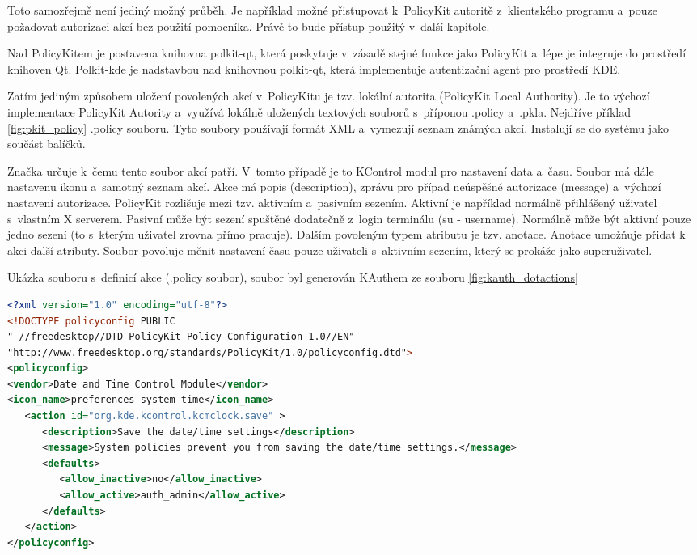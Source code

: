 Toto samozřejmě není jediný možný průběh. Je například možné přistupovat k~PolicyKit autoritě z~klientského programu a~pouze požadovat autorizaci akcí bez použití pomocníka. Právě to bude přístup použitý v~další kapitole.

Nad PolicyKitem je postavena knihovna polkit-qt, která poskytuje v~zásadě stejné funkce jako PolicyKit a~lépe je integruje do prostředí knihoven Qt. Polkit-kde je nadstavbou nad knihovnou polkit-qt, která implementuje autentizační agent pro prostředí KDE.

Zatím jediným způsobem uložení povolených akcí v~PolicyKitu je tzv. lokální autorita (PolicyKit Local Authority). Je to výchozí implementace PolicyKit Autority a~využívá lokálně uložených textových souborů s~příponou .policy a~.pkla. Nejdříve příklad \ref{fig:pkit_policy} .policy souboru. Tyto soubory používají formát XML a~vymezují seznam známých akcí. Instalují se do systému jako součást balíčků.

Značka  určuje k~čemu tento soubor akcí patří. V~tomto případě je to KControl modul pro nastavení data a~času. Soubor má dále nastavenu ikonu a~samotný seznam akcí. Akce má popis (description), zprávu pro případ neúspěšné autorizace (message) a~výchozí nastavení autorizace. PolicyKit rozlišuje mezi tzv. aktivním a~pasivním sezením. Aktivní je například normálně přihlášený uživatel s~vlastním X serverem. Pasivní může být sezení spuštěné dodatečně z~login terminálu (su - username). Normálně může být aktivní pouze jedno sezení (to s~kterým uživatel zrovna přímo pracuje). Dalším povoleným typem atributu je tzv. anotace. Anotace umožňuje přidat k akci další atributy. Soubor povoluje měnit nastavení času pouze uživateli s~aktivním sezením, který se prokáže jako superuživatel.

\begin{mylisting}
\caption{Ukázka souboru s~definicí akce (.policy soubor), soubor byl generován KAuthem ze souboru \ref{fig:kauth_dotactions}}
\label{fig:pkit_policy}
\begin{lstlisting}[language=XML]
<?xml version="1.0" encoding="utf-8"?>
<!DOCTYPE policyconfig PUBLIC
"-//freedesktop//DTD PolicyKit Policy Configuration 1.0//EN"
"http://www.freedesktop.org/standards/PolicyKit/1.0/policyconfig.dtd">
<policyconfig>
<vendor>Date and Time Control Module</vendor>
<icon_name>preferences-system-time</icon_name>
   <action id="org.kde.kcontrol.kcmclock.save" >
      <description>Save the date/time settings</description>
      <message>System policies prevent you from saving the date/time settings.</message>
      <defaults>
         <allow_inactive>no</allow_inactive>
         <allow_active>auth_admin</allow_active>
      </defaults>
   </action>
</policyconfig>
\end{lstlisting}
\end{mylisting}

